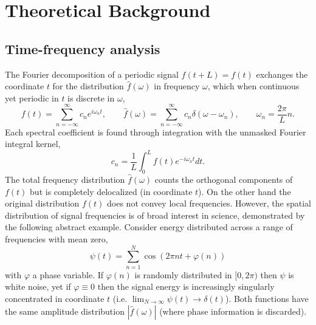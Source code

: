 \documentclass{article}
\begin{document}

\section{Theoretical Background}\label{theory}
\subsection{Time-frequency analysis}
The Fourier decomposition of a periodic signal $f(t+L)=f(t)$ exchanges the coordinate $t$ for the distribution $\hat{f}(\omega)$ in frequency $\omega$, which when continuous yet periodic in $t$ is discrete in $\omega$,
\begin{equation}
  f(t) = \sum_{n=-\infty}^\infty c_ne^{i\omega_nt},\quad\quad \hat{f}(\omega) = \sum_{n=-\infty}^\infty c_n\delta(\omega - \omega_n),\quad\quad \omega_n = \frac{2\pi}{L}n.
\end{equation}
Each spectral coefficient is found through integration with the unmasked Fourier integral kernel,
\begin{equation}
  c_n = \frac{1}{L}\int_0^L f(t)e^{-i\omega_nt}dt.
\end{equation}
The total frequency distribution $\hat{f}(\omega)$ counts the orthogonal components of $f(t)$ but is completely delocalized (in coordinate $t$). On the other hand the original distribution $f(t)$ does not convey local frequencies. However, the spatial distribution of signal frequencies is of broad interest in science, demonstrated by the following abstract example. Consider energy distributed across a range of frequencies with mean zero,
\begin{equation}
  \psi(t) = \sum_{n=1}^N\cos(2\pi nt + \varphi(n))
\end{equation}
with $\varphi$ a phase variable. If $\varphi(n)$ is randomly distributed in $[0,2\pi)$ then $\psi$ is white noise, yet if $\varphi \equiv 0$ then the signal energy is increasingly singularly concentrated in coordinate $t$ (i.e. $\lim_{N\to\infty}\psi(t)\to\delta(t)$). Both functions have the same amplitude distribution $|\hat{f}(\omega)|$ (where phase information is discarded).
\end{document}
